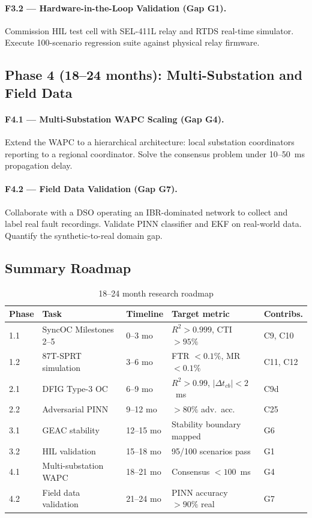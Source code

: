 \paragraph{F3.2 --- Hardware-in-the-Loop Validation (Gap G1).}
Commission HIL test cell with SEL-411L relay and RTDS real-time simulator.
Execute 100-scenario regression suite against physical relay firmware.

\subsection{Phase 4 (18--24 months): Multi-Substation and Field Data}

\paragraph{F4.1 --- Multi-Substation WAPC Scaling (Gap G4).}
Extend the WAPC to a hierarchical architecture: local substation
coordinators reporting to a regional coordinator.
Solve the consensus problem under 10--50~ms propagation delay.

\paragraph{F4.2 --- Field Data Validation (Gap G7).}
Collaborate with a DSO operating an IBR-dominated network to collect
and label real fault recordings. Validate PINN classifier and EKF
on real-world data. Quantify the synthetic-to-real domain gap.

\subsection{Summary Roadmap}

\begin{table}[htbp]
\caption{18--24 month research roadmap}
\label{tab:ch13_roadmap}
\small
\begin{tabularx}{\textwidth}{@{}lp{3cm}lXl@{}}
\toprule
Phase & Task & Timeline & Target metric & Contribs. \\
\midrule
1.1 & SyncOC Milestones 2--5 & 0--3 mo & $R^2>0.999$, CTI $>95\%$ & C9, C10 \\
1.2 & 87T-SPRT simulation & 3--6 mo & FTR $<0.1\%$, MR $<0.1\%$ & C11, C12 \\
2.1 & DFIG Type-3 OC & 6--9 mo & $R^2>0.99$, $|\Delta t_{cb}|<2$~ms & C9d \\
2.2 & Adversarial PINN & 9--12 mo & $>80\%$ adv.\ acc.\ & C25 \\
3.1 & GEAC stability & 12--15 mo & Stability boundary mapped & G6 \\
3.2 & HIL validation & 15--18 mo & 95/100 scenarios pass & G1 \\
4.1 & Multi-substation WAPC & 18--21 mo & Consensus $<100$~ms & G4 \\
4.2 & Field data validation & 21--24 mo & PINN accuracy $>90\%$ real & G7 \\
\bottomrule
\end{tabularx}
\end{table}

